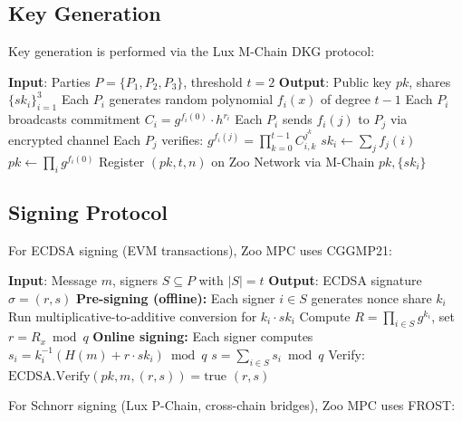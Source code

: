 \documentclass[11pt,letterpaper]{article}
\begin{document}
\subsection{Key Generation}

Key generation is performed via the Lux M-Chain DKG protocol:

\begin{algorithm}[t]
\caption{Zoo MPC Key Generation}
\label{alg:keygen}
\begin{algorithmic}[1]
\STATE \textbf{Input}: Parties $P = \{P_1, P_2, P_3\}$, threshold $t = 2$
\STATE \textbf{Output}: Public key $pk$, shares $\{sk_i\}_{i=1}^3$
\STATE Each $P_i$ generates random polynomial $f_i(x)$ of degree $t - 1$
\STATE Each $P_i$ broadcasts commitment $C_i = g^{f_i(0)} \cdot h^{r_i}$
\STATE Each $P_i$ sends $f_i(j)$ to $P_j$ via encrypted channel
\STATE Each $P_j$ verifies: $g^{f_i(j)} = \prod_{k=0}^{t-1} C_{i,k}^{j^k}$
\STATE $sk_i \leftarrow \sum_{j} f_j(i)$
\STATE $pk \leftarrow \prod_{i} g^{f_i(0)}$
\STATE Register $(pk, t, n)$ on Zoo Network via M-Chain
\RETURN $pk, \{sk_i\}$
\end{algorithmic}
\end{algorithm}

\subsection{Signing Protocol}

For ECDSA signing (EVM transactions), Zoo MPC uses CGGMP21:

\begin{algorithm}[t]
\caption{CGGMP21 Threshold Signing on Zoo}
\label{alg:sign}
\begin{algorithmic}[1]
\STATE \textbf{Input}: Message $m$, signers $S \subseteq P$ with $|S| = t$
\STATE \textbf{Output}: ECDSA signature $\sigma = (r, s)$
\STATE \textbf{Pre-signing (offline):}
\STATE Each signer $i \in S$ generates nonce share $k_i$
\STATE Run multiplicative-to-additive conversion for $k_i \cdot sk_i$
\STATE Compute $R = \prod_{i \in S} g^{k_i}$, set $r = R_x \bmod q$
\STATE \textbf{Online signing:}
\STATE Each signer computes $s_i = k_i^{-1}(H(m) + r \cdot sk_i) \bmod q$
\STATE $s = \sum_{i \in S} s_i \bmod q$
\STATE Verify: $\text{ECDSA.Verify}(pk, m, (r, s)) = \text{true}$
\RETURN $(r, s)$
\end{algorithmic}
\end{algorithm}

For Schnorr signing (Lux P-Chain, cross-chain bridges), Zoo MPC uses FROST:
\end{document}
